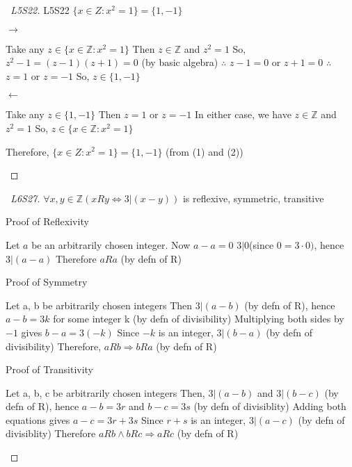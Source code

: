 \documentclass[a4paper]{article}
\theoremstyle{definition}
\begin{document}
\begin{proof}[\proofname\ L5S22] L5S22 $\{x \in Z: x^2 = 1\} = \{1, -1\}$
  \begin{numpf*}
    \pfln $\rightarrow$
    \begin{subpf*}
      \pfln Take any $z \in \{x \in \mathbb{Z} : x^2 = 1\}$
      \pfln Then $z \in \mathbb{Z}$ and $z^2 = 1$
      \pfln So, $z^2 -1 = (z-1)(z+1) = 0$ (by basic algebra)
      \pfln $\therefore$ $z-1 = 0$ or $z +1 = 0$
      \pfln $\therefore$ $z = 1$ or $z = -1$
      \pfln So, $z \in \{1, -1\}$
    \end{subpf*}
    \pfln $\leftarrow$
    \begin{subpf*}
      \pfln Take any $z \in \{1, -1\}$
      \pfln Then $z = 1$ or $z=-1$
      \pfln In either case, we have $z \in \mathbb{Z}$ and $z^2 = 1$
      \pfln So, $z \in \{x \in \mathbb{Z} : x^2 = 1\}$
    \end{subpf*}
    \pfln Therefore, $\{x \in Z: x^2 = 1\} = \{1, -1\}$ (from (1) and (2))
  \end{numpf*}
\end{proof}

\begin{proof}[\proofname\ L6S27] $\forall x,y \in \mathbb{Z} (xRy \Leftrightarrow 3 | (x-y))$ is reflexive, symmetric, transitive
  \begin{numpf*}
    \pfln Proof of Reflexivity
    \begin{subpf*}
      \pfln Let $a$ be an arbitrarily chosen integer.
      \pfln Now $a - a = 0$
      \pfln $3 | 0 $(since $ 0 = 3 \cdot 0)$, hence $3 |(a - a)$
      \pfln Therefore $aRa$ (by defn of R)
    \end{subpf*}
    \pfln Proof of Symmetry
    \begin{subpf*}
      \pfln Let a, b be arbitrarily chosen integers
      \pfln Then $3|(a-b)$ (by defn of R), hence $a-b = 3k$ for some integer k (by defn of divisibility)
      \pfln Multiplying both sides by $-1$ gives $b-a = 3(-k)$
      \pfln Since $-k$ is an integer, $3 | (b-a)$ (by defn of divisibility)
      \pfln Therefore, $aRb \Rightarrow bRa$ (by defn of R)
    \end{subpf*}
    \pfln Proof of Transitivity
    \begin{subpf*}
      \pfln Let a, b, c be arbitrarily chosen integers
      \pfln Then, $3 | (a - b)$ and $3 | (b - c)$ (by defn of R), hence $a-b = 3r$ and $b-c = 3s$ (by defn of divisiblity)
      \pfln Adding both equations gives $a - c = 3r + 3s$
      \pfln Since $r+s$ is an integer, $3 | (a - c)$ (by defn of divisiblity)
      \pfln Therefore $aRb \land bRc \Rightarrow aRc$ (by defn of R)
    \end{subpf*}
  \end{numpf*}
\end{proof}
\end{document}
